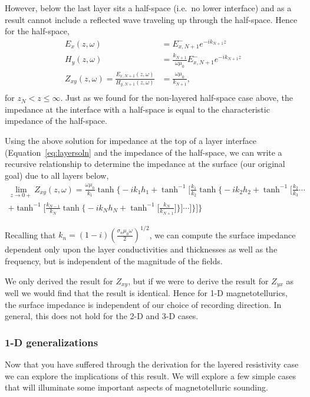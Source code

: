 However, below the last layer sits a half-space (i.e.\ no lower interface) and
as a result cannot include a reflected wave traveling up through the half-space.
Hence for the half-space,
\begin{align*}
    E_x(z,\omega) & = E_{x,N+1}^- e^{-i k_{N+1} z} \\
    H_y(z,\omega) & = \frac{k_{N+1}}{\omega \mu_0} E_{x,N+1}^- e^{-i k_{N+1} z} \\
    Z_{xy}(z,\omega) = \frac{E_{x,N+1}(z,\omega)}{H_{y,N+1}(z,\omega)} & 
        = \frac{\omega \mu_0}{k_{N+1}}, \\
\end{align*}
for $z_N < z \leq \infty$.  Just as we found for the non-layered half-space case
above, the impedance at the interface with a half-space is equal to the
characteristic impedance of the half-space.

Using the above solution for impedance at the top of a layer interface
(Equation~\ref{eq:layersoln} and the impedance of the half-space, we can write a
recursive relationship to determine the impedance at the surface (our original
goal) due to all layers below,
\begin{multline}
    \lim_{z \to 0+} Z_{xy}(z,\omega) =
        \frac{\omega \mu_0}{k_1} \tanh \Biggl\{ -i k_1 h_1 
        + \tanh^{-1} \Biggl[ \frac{k_1}{k_2} \tanh \Biggl\{ -i k_2 h_2
        + \tanh^{-1} \Biggl[ \frac{k_2}{k_3} \cdots \\
        + \tanh^{-1} \Biggl[ \frac{k_{N-1}}{k_N} \tanh \Biggl\{ -i k_N h_N 
        + \tanh^{-1} \Biggl[ \frac{k_N}{k_{N+1}} \Biggr] \Biggr\} \Biggr] 
        \cdots  \Biggr] \Biggr\} \Biggr] \Biggr\}
\end{multline}

Recalling that $k_n = (1 - i)\left( \frac{\sigma_n \mu_0 \omega}{2}
\right)^{1/2}$, we can compute the surface impedance dependent only upon the
layer conductivities and thicknesses as well as the frequency, but is
independent of the magnitude of the fields.

We only derived the result for $Z_{xy}$, but if we were to derive the result for
$Z_{yx}$ as well we would find that the result is identical.  Hence for 1-D
magnetotellurics, the surface impedance is independent of our choice of
recording direction.  In general, this does not hold for the 2-D and 3-D cases.

\subsubsection{1-D generalizations}
Now that you have suffered through the derivation for the layered resistivity
case we can explore the implications of this result.  We will explore a few
simple cases that will illuminate some important aspects of magnetotelluric
sounding.

